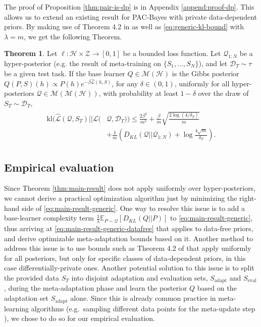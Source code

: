 \documentclass{article} %
\theoremstyle{definition}
\newtheorem{theorem}{Theorem}[section]
\newcommand{\Expect}[2]{\mathbb{E}_{#1}\left [#2 \right ]}
\begin{document}
The proof of Proposition \ref{thm:pair-is-dp} is in Appendix \ref{append:proof-dp}. This  allows us to extend an existing result for PAC-Bayes with private data-dependent priors.
By making use of Theorem 4.2 in \citet{Dziugaite2018} as well as  \eqref{eq:generic-kl-bound} with $\lambda=m$, we get the following Theorem.

\begin{theorem} \label{thm:kl-main-result}
	Let $\ell:\mathcal{H}\times \mathcal{Z}\rightarrow [0,1]$ be a bounded loss function.
	Let $\mathcal{Q}_{1:N}$ be a hyper-posterior (e.g. the result of meta-training on $\{S_1,...,S_N\}$), and let $\mathcal{D}_T\sim \tau$ be a given test task. 
	If the base learner $Q\in \mathcal{M}(\mathcal{H})$ is the Gibbs posterior $Q(P, S)(h)\propto P(h)e^{-\beta\hat{\mathcal{L}}(h, S)}$, 
	for any $\delta\in(0,1)$, uniformly for all hyper-posteriors $\mathcal{Q}\in \mathcal{M}(\mathcal{M}(\mathcal{H}))$, with probability at least $1-\delta$ over the draw of $S_T\sim \mathcal{D}_T$,
%
	\begin{align*} 
	\begin{split}
	\mathrm{kl}(\hat{\mathcal{L}}(\mathcal{Q},S_T)||\mathcal{L}(&\mathcal{Q},\mathcal{D}_T))\leq \frac{2\beta^2}{m^2}+\frac{\beta}{m}\sqrt{\frac{2\log (4/\delta_T)}{m}} \\
	&+\frac{1}{m}\left (D_{KL}(\mathcal{Q}||\mathcal{Q}_{1:N})+\log\frac{4\sqrt{m}}{\delta_T} \right ) .
	\end{split}
	\end{align*}
	
\end{theorem}

\subsection{Empirical evaluation}

Since Theorem \ref{thm:main-result} does not apply uniformly over hyper-posteriors, we cannot derive a practical optimization algorithm just by minimizing the right-hand side of  \eqref{eq:main-result-generic}. 
One way to resolve this issue is to add a base-learner complexity term $\frac{1}{\lambda}\Expect{P\sim \mathcal{Q}}{D_{KL}(Q||P)}$ to  \eqref{eq:main-result-generic}, thus arriving at \eqref{eq:main-result-generic-datafree} that applies to data-free priors, and derive optimizable meta-adaptation bounds based on it.
Another method to address this issue is to use bounds such as Theorem 4.2 of \citet{Dziugaite2018} that apply uniformly for all posteriors, but only for specific classes of data-dependent priors, in this case differentially-private ones.
Another potential solution to this issue is to split the provided data $S_T$ into disjoint adaptation and evaluation sets, $S_{\mathrm{adapt}}$ and $S_{\mathrm{eval}}$, during the meta-adaptation phase and learn the posterior $Q$ based on the adaptation set $S_{\mathrm{adapt}}$ alone. Since this is already common practice in meta-learning algorithms (e.g.\ sampling different data points for the meta-update step ), we chose to do so for our empirical evaluation. %
\end{document}
